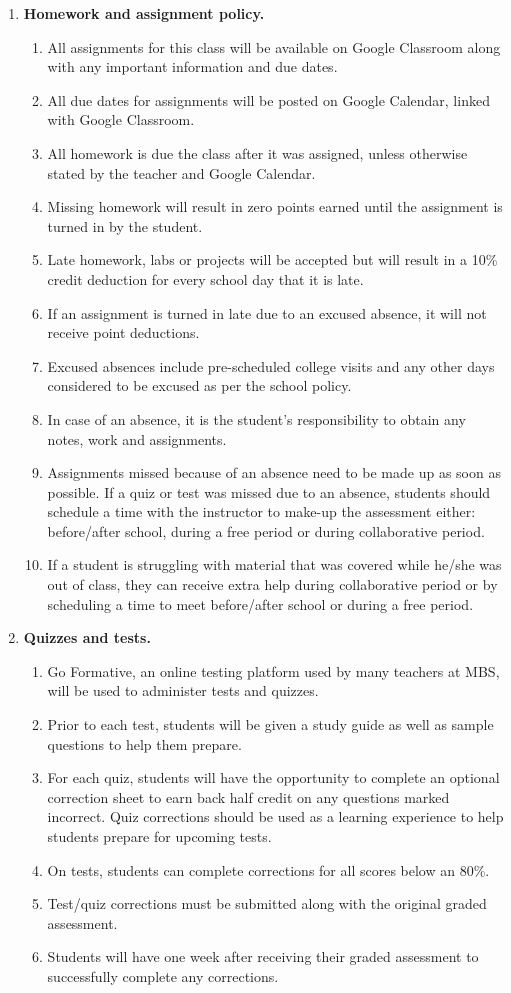 \documentclass{article}
\begin{document}
\begin{enumerate}
\item \textbf{Homework and assignment policy.} 
\begin{enumerate}
\item All assignments for this class will be available on Google Classroom along with any important information and due dates.
\item All due dates for assignments will be posted on Google Calendar, linked with Google Classroom.
\item All homework is due the class after it was assigned, unless otherwise stated by the teacher and Google Calendar.
\item Missing homework will result in zero points earned until the assignment is turned in by the student.
\item Late homework, labs or projects will be accepted but will result in a 10\% credit deduction for every school day that it is late.
\item If an assignment is turned in late due to an excused absence, it will not receive point deductions.
\item Excused absences include pre-scheduled college visits and any other days considered to be excused as per the school policy.
\item In case of an absence, it is the student’s responsibility to obtain any notes, work and assignments.
\item Assignments missed because of an absence need to be made up as soon as possible. If a quiz or test was missed due to an absence, students should schedule a time with the instructor to make-up the assessment either: before/after school, during a free period or during collaborative period.
\item If a student is struggling with material that was covered while he/she was out of class, they can receive extra help during collaborative period or by scheduling a time to meet before/after school or during a free period.
\end{enumerate}

\item \textbf{Quizzes and tests.} 
\begin{enumerate}
\item Go Formative, an online testing platform used by many teachers at MBS, will be used to administer tests and quizzes.
\item Prior to each test, students will be given a study guide as well as sample questions to help them prepare.
\item For each quiz, students will have the opportunity to complete an optional correction sheet to earn back half credit on any questions marked incorrect. Quiz corrections should be used as a learning experience to help students prepare for upcoming tests.
\item On tests, students can complete corrections for all scores below an 80\%.
\item Test/quiz corrections must be submitted along with the original graded assessment.
\item Students will have one week after receiving their graded assessment to successfully complete any corrections.
\end{enumerate}


\end{enumerate}
\end{document}

